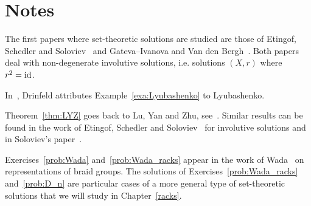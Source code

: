 \section*{Notes}

The first papers where set-theoretic solutions are studied are those of Etingof, Schedler and Soloviev~\cite{MR1722951} 
and Gateva--Ivanova and Van den Bergh~\cite{MR1637256}. 
Both papers deal with non-degenerate involutive solutions, i.e. solutions
$(X,r)$ where $r^2=\operatorname{id}$.  

In~\cite{MR1183474}, Drinfeld attributes Example~\ref{exa:Lyubashenko} to 
Lyubashenko. 

Theorem~\ref{thm:LYZ} goes back to Lu, Yan and Zhu, see~\cite{MR1769723}.
Similar results can be found in the work of Etingof, Schedler and Soloviev~\cite{MR1722951} 
for involutive solutions 
and in Soloviev's paper~\cite{MR1809284}.

Exercises~\ref{prob:Wada} and~\ref{prob:Wada_racks} 
appear in the work of Wada~\cite{MR1167178} on representations of braid groups. 
The solutions of Exercises~\ref{prob:Wada_racks} and~\ref{prob:D_n} 
are particular cases of a more general type of set-theoretic solutions that we will study in 
Chapter~\ref{racks}.  
 

